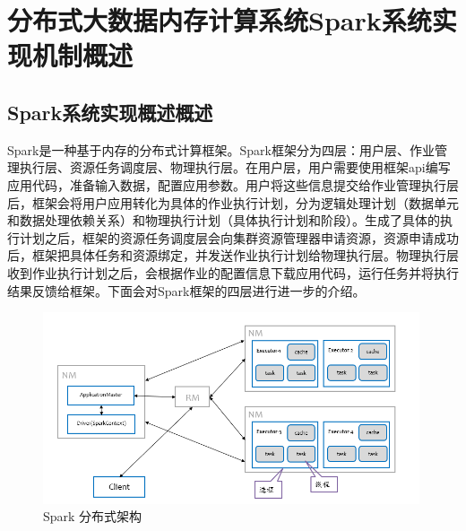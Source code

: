 \chapter{分布式大数据内存计算系统Spark系统实现机制概述}\label{chap:basic}
\section{Spark系统实现概述概述}
Spark是一种基于内存的分布式计算框架。Spark框架分为四层：用户层、作业管理执行层、资源任务调度层、物理执行层。在用户层，用户需要使用框架api编写应用代码，准备输入数据，配置应用参数。用户将这些信息提交给作业管理执行层后，框架会将用户应用转化为具体的作业执行计划，分为逻辑处理计划（数据单元和数据处理依赖关系）和物理执行计划（具体执行计划和阶段）。生成了具体的执行计划之后，框架的资源任务调度层会向集群资源管理器申请资源，资源申请成功后，框架把具体任务和资源绑定，并发送作业执行计划给物理执行层。物理执行层收到作业执行计划之后，会根据作业的配置信息下载应用代码，运行任务并将执行结果反馈给框架。下面会对Spark框架的四层进行进一步的介绍。

\begin{figure}
    \centering
    \includegraphics[width=0.99\textwidth]{Img/spark-distribution-framework.png}
    \caption{Spark 分布式架构}
    \label{fig:spark-framework}
\end{figure}

